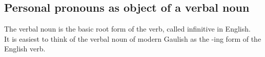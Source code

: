 \subsection{Personal pronouns as object of a verbal noun}

\noindent The verbal noun is the basic root form of the verb, called infinitive in English.\\

\noindent It is easiest to think of the verbal noun of modern Gaulish as the -ing form of the English verb.\\

